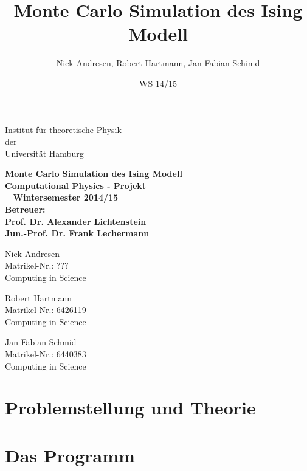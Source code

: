 \documentclass[12pt,a4paper, german]{article}
\title{Monte Carlo Simulation des Ising Modell}
\author{Niek Andresen, Robert Hartmann, Jan Fabian Schimd}
\date{WS 14/15}
\newcommand{\changefont}[3]{
\fontfamily{#1} \fontseries{#2} \fontshape{#3} \selectfont}
\begin{document}
\begin{titlepage}
   

        \begin{center}
            \changefont{cmr}{m}{sc} 
            Institut für theoretische Physik\\
            der\\
            Universität Hamburg\\
            \vspace{5cm}

            \large\bf{Monte Carlo Simulation des Ising Modell}\\
           \vspace{2cm}       
             Computational Physics - Projekt\\\
            \vspace{3cm}
            \large Wintersemester 2014/15\\
	\vspace{2cm}
	Betreuer:\\
	Prof. Dr. Alexander Lichtenstein\\
	Jun.-Prof. Dr. Frank Lechermann\\
	



        \end{center}
\vfill
	\parbox{5cm}{\footnotesize
           Niek Andresen\\
           Matrikel-Nr.: ???\\
	Computing in Science}
\hfill
	\parbox{5cm}{\footnotesize
           Robert Hartmann\\
           Matrikel-Nr.: 6426119\\
	Computing in Science}
\hfill
	\parbox{5cm}{\footnotesize
           Jan Fabian Schmid\\
           Matrikel-Nr.: 6440383\\
	Computing in Science}
\end{titlepage}
\maketitle

\tableofcontents
\newpage

\section{Problemstellung und Theorie}

\newpage
\section{Das Programm}

\newpage
\end{document}
